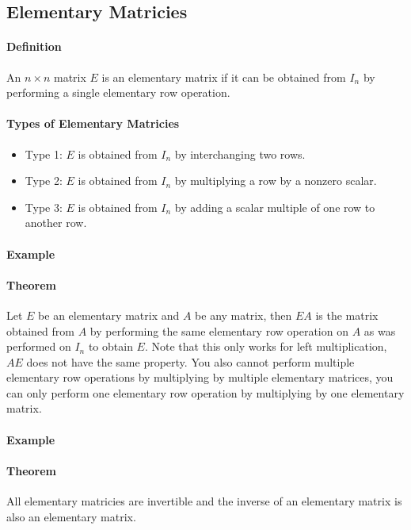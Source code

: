 \subsection{Elementary Matricies}
\hrulefill
\paragraph*{Definition}
An $n \times n$ matrix $E$ is an elementary matrix if it can be obtained from $I_n$ by performing a single elementary row operation.

\paragraph*{Types of Elementary Matricies}
\begin{itemize}
    \item Type 1: $E$ is obtained from $I_n$ by interchanging two rows.
    \item Type 2: $E$ is obtained from $I_n$ by multiplying a row by a nonzero scalar.
    \item Type 3: $E$ is obtained from $I_n$ by adding a scalar multiple of one row to another row.
\end{itemize}

\paragraph*{Example} %

\paragraph*{Theorem}
Let $E$ be an elementary matrix and $A$ be any matrix, then $EA$ is the matrix obtained from $A$ by performing the same elementary row operation on $A$ as was performed on $I_n$ to obtain $E$.
Note that this only works for left multiplication, $AE$ does not have the same property. You also cannot perform multiple elementary row operations by multiplying by multiple elementary matrices, 
you can only perform one elementary row operation by multiplying by one elementary matrix.

\paragraph*{Example} %

\paragraph*{Theorem}
All elementary matricies are invertible and the inverse of an elementary matrix is also an elementary matrix.

